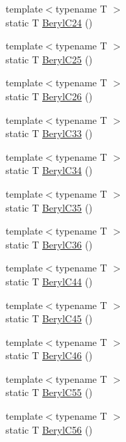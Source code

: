\begin{DoxyCompactItemize}
\item 
{\footnotesize template$<$typename T $>$ }\\static T \mbox{\hyperlink{namespacempc_1_1data_a988b0e58087ff3e8aa326d468b377d34}{Beryl\+C24}} ()
\item 
{\footnotesize template$<$typename T $>$ }\\static T \mbox{\hyperlink{namespacempc_1_1data_a0519acea7ad38ae344434269dc4b4986}{Beryl\+C25}} ()
\item 
{\footnotesize template$<$typename T $>$ }\\static T \mbox{\hyperlink{namespacempc_1_1data_a29defc7bc4b497e9f308699ac1b158a4}{Beryl\+C26}} ()
\item 
{\footnotesize template$<$typename T $>$ }\\static T \mbox{\hyperlink{namespacempc_1_1data_a0b42ee7f60437147a4dfd2eaa741814b}{Beryl\+C33}} ()
\item 
{\footnotesize template$<$typename T $>$ }\\static T \mbox{\hyperlink{namespacempc_1_1data_ab1ccd81790bafbfb42636b50043d3c09}{Beryl\+C34}} ()
\item 
{\footnotesize template$<$typename T $>$ }\\static T \mbox{\hyperlink{namespacempc_1_1data_aed08ee7c40c42f8b3ec77aa9b7f17ee6}{Beryl\+C35}} ()
\item 
{\footnotesize template$<$typename T $>$ }\\static T \mbox{\hyperlink{namespacempc_1_1data_a91605388a6644b9594b813449eb9b3fc}{Beryl\+C36}} ()
\item 
{\footnotesize template$<$typename T $>$ }\\static T \mbox{\hyperlink{namespacempc_1_1data_a49fcc3569e92d83d14c2e18782998f8f}{Beryl\+C44}} ()
\item 
{\footnotesize template$<$typename T $>$ }\\static T \mbox{\hyperlink{namespacempc_1_1data_a530753389418e95ad497025c6143fd35}{Beryl\+C45}} ()
\item 
{\footnotesize template$<$typename T $>$ }\\static T \mbox{\hyperlink{namespacempc_1_1data_aa27791ce03f74fddb8c74ae528b36199}{Beryl\+C46}} ()
\item 
{\footnotesize template$<$typename T $>$ }\\static T \mbox{\hyperlink{namespacempc_1_1data_ac62929b6543c9ae83708eab47c8bf4e7}{Beryl\+C55}} ()
\item 
{\footnotesize template$<$typename T $>$ }\\static T \mbox{\hyperlink{namespacempc_1_1data_a7c9e221e0ee89f1a729680e6e099e8fb}{Beryl\+C56}} ()

\end{DoxyCompactItemize}
